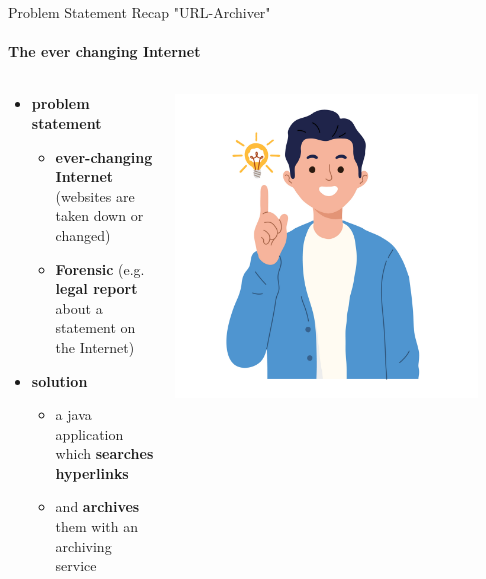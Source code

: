 \documentclass[
    ngerman,%
    authorontitle=true,
]{bfhbeamer}
\begin{document}
    \begin{frame}{Problem Statement Recap "URL-Archiver"}
    	\framesubtitle{The ever changing Internet}
    	\begin{columns} %
    		\begin{column}{0.7\textwidth} %
    			\begin{itemize}
    				\item \textbf{problem statement}
    				\begin{itemize}
                        \item \textbf{ever-changing Internet} (websites are taken down or changed)
    				    \item \textbf{Forensic} (e.g. \textbf{legal report} about a statement on the Internet)
                    \end{itemize}
                    \bigskip
                    \item \textbf{solution}
                    \begin{itemize}
                        \item a java application which \textbf{searches hyperlinks}
                        \item and \textbf{archives} them with an archiving service
                    \end{itemize}
    			\end{itemize}
    		\end{column}
    		\begin{column}{0.3\textwidth} %
	    		\begin{center}
	    			\includegraphics[width=0.9\textwidth]{pictures/final_presentation/idea.jpg}
	    		\end{center}
    		\end{column}
    	\end{columns}
    \end{frame}
\end{document}
